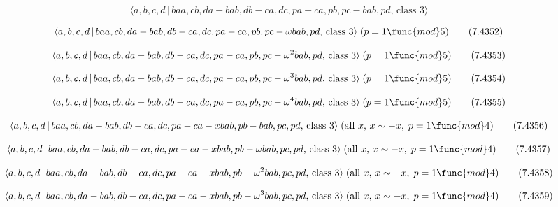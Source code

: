 \documentclass[10pt]{article}
\begin{document}
\begin{equation}
\langle a,b,c,d\,|\,baa,cb,da-bab,db-ca,dc,pa-ca,pb,pc-bab,pd,\,\text{class }%
3\rangle  \tag{7.4351}
\end{equation}

\begin{equation}
\langle a,b,c,d\,|\,baa,cb,da-bab,db-ca,dc,pa-ca,pb,pc-\omega bab,pd,\,\text{%
class }3\rangle \;(p=1\func{mod}5)  \tag{7.4352}
\end{equation}

\begin{equation}
\langle a,b,c,d\,|\,baa,cb,da-bab,db-ca,dc,pa-ca,pb,pc-\omega ^{2}bab,pd,\,%
\text{class }3\rangle \;(p=1\func{mod}5)  \tag{7.4353}
\end{equation}

\begin{equation}
\langle a,b,c,d\,|\,baa,cb,da-bab,db-ca,dc,pa-ca,pb,pc-\omega ^{3}bab,pd,\,%
\text{class }3\rangle \;(p=1\func{mod}5)  \tag{7.4354}
\end{equation}

\begin{equation}
\langle a,b,c,d\,|\,baa,cb,da-bab,db-ca,dc,pa-ca,pb,pc-\omega ^{4}bab,pd,\,%
\text{class }3\rangle \;(p=1\func{mod}5)  \tag{7.4355}
\end{equation}

\begin{equation}
\langle a,b,c,d\,|\,baa,cb,da-bab,db-ca,dc,pa-ca-xbab,pb-bab,pc,pd,\,\text{%
class }3\rangle \;(\text{all }x,\,x\sim -x,\;p=1\func{mod}4)  \tag{7.4356}
\end{equation}

\begin{equation}
\langle a,b,c,d\,|\,baa,cb,da-bab,db-ca,dc,pa-ca-xbab,pb-\omega bab,pc,pd,\,%
\text{class }3\rangle \;(\text{all }x,\,x\sim -x,\;p=1\func{mod}4) 
\tag{7.4357}
\end{equation}

\begin{equation}
\langle a,b,c,d\,|\,baa,cb,da-bab,db-ca,dc,pa-ca-xbab,pb-\omega
^{2}bab,pc,pd,\,\text{class }3\rangle \;(\text{all }x,\,x\sim -x,\;p=1\func{%
mod}4)  \tag{7.4358}
\end{equation}

\begin{equation}
\langle a,b,c,d\,|\,baa,cb,da-bab,db-ca,dc,pa-ca-xbab,pb-\omega
^{3}bab,pc,pd,\,\text{class }3\rangle \;(\text{all }x,\,x\sim -x,\;p=1\func{%
mod}4)  \tag{7.4359}
\end{equation}
\end{document}
